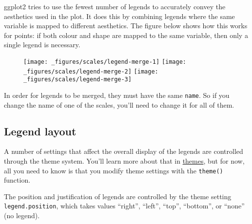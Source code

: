 ggplot2 tries to use the fewest number of legends to accurately convey
the aesthetics used in the plot. It does this by combining legends where
the same variable is mapped to different aesthetics. The figure below
shows how this works for points: if both colour and shape are mapped to
the same variable, then only a single legend is necessary.

\begin{Shaded}
\begin{Highlighting}[]
\OperatorTok{+}\StringTok{ }\NormalTok{(}\NormalTok{(}
\OperatorTok{+}\StringTok{ }\NormalTok{(}\NormalTok{(}
\OperatorTok{+}\StringTok{ }\NormalTok{(}\NormalTok{(}
\end{Highlighting}
\end{Shaded}

\begin{figure}[H]
  \texttt{[image: \_figures/scales/legend-merge-1]}%
  \texttt{[image: \_figures/scales/legend-merge-2]}%
  \texttt{[image: \_figures/scales/legend-merge-3]}
\end{figure}

In order for legends to be merged, they must have the same
\texttt{name}. So if you change the name of one of the scales, you'll
need to change it for all of them.

\hypertarget{sub:legend-layout}{%
\subsection{Legend layout}\label{sub:legend-layout}}

A number of settings that affect the overall display of the legends are
controlled through the theme system. You'll learn more about that in
\protect\hyperlink{sec:themes}{themes}, but for now, all you need to
know is that you modify theme settings with the \texttt{theme()}
function. 

The position and justification of legends are controlled by the theme
setting \texttt{legend.position}, which takes values ``right'',
``left'', ``top'', ``bottom'', or ``none'' (no legend).

